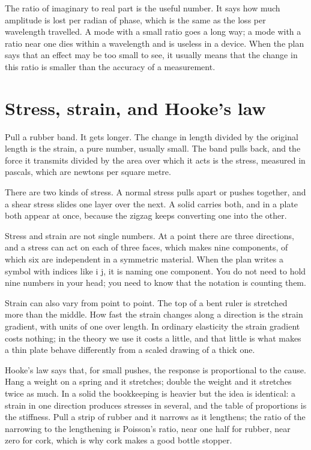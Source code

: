 \documentclass[11pt]{article}
\begin{document}
The ratio of imaginary to real part is the useful number. It says how much amplitude is lost per radian of
phase, which is the same as the loss per wavelength travelled. A mode with a small ratio goes a long way; a
mode with a ratio near one dies within a wavelength and is useless in a device. When the plan says that an
effect may be too small to see, it usually means that the change in this ratio is smaller than the accuracy of
a measurement.

\section{Stress, strain, and Hooke's law}

Pull a rubber band. It gets longer. The change in length divided by the original length is the strain, a pure
number, usually small. The band pulls back, and the force it transmits divided by the area over which it acts
is the stress, measured in pascals, which are newtons per square metre.

There are two kinds of stress. A normal stress pulls apart or pushes together, and a shear stress slides one
layer over the next. A solid carries both, and in a plate both appear at once, because the zigzag keeps
converting one into the other.

Stress and strain are not single numbers. At a point there are three directions, and a stress can act on each
of three faces, which makes nine components, of which six are independent in a symmetric material. When the
plan writes a symbol with indices like i j, it is naming one component. You do not need to hold nine numbers
in your head; you need to know that the notation is counting them.

Strain can also vary from point to point. The top of a bent ruler is stretched more than the middle. How fast
the strain changes along a direction is the strain gradient, with units of one over length. In ordinary
elasticity the strain gradient costs nothing; in the theory we use it costs a little, and that little is what
makes a thin plate behave differently from a scaled drawing of a thick one.

Hooke's law says that, for small pushes, the response is proportional to the cause. Hang a weight on a spring
and it stretches; double the weight and it stretches twice as much. In a solid the bookkeeping is heavier but
the idea is identical: a strain in one direction produces stresses in several, and the table of proportions is
the stiffness. Pull a strip of rubber and it narrows as it lengthens; the ratio of the narrowing to the
lengthening is Poisson's ratio, near one half for rubber, near zero for cork, which is why cork makes a good
bottle stopper.
\end{document}
